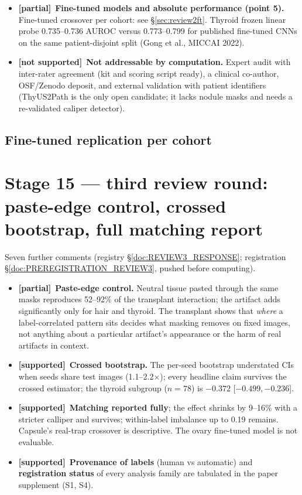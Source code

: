 \documentclass[10pt,a4paper]{article}
\newcommand{\ok}{\textcolor{green!50!black}{\textbf{[supported]}}}
\newcommand{\no}{\textcolor{red!70!black}{\textbf{[not supported]}}}
\newcommand{\mixed}{\textcolor{orange!80!black}{\textbf{[partial]}}}
\begin{document}
\begin{itemize}[leftmargin=*]
tool in the supplement and the remedies become a decision guide (author decision).
\item \mixed\ \textbf{Fine-tuned models and absolute performance (point 5).} Fine-tuned crossover per cohort: see
\S\ref{sec:review2ft}. Thyroid frozen linear probe 0.735--0.736 AUROC versus 0.773--0.799 for published fine-tuned CNNs
on the same patient-disjoint split (Gong et al., MICCAI 2022).
\item \no\ \textbf{Not addressable by computation.} Expert audit with inter-rater agreement (kit and scoring script
ready), a clinical co-author, OSF/Zenodo deposit, and external validation with patient identifiers (ThyUS2Path is the
only open candidate; it lacks nodule masks and needs a re-validated caliper detector).
\end{itemize}



\subsection*{Fine-tuned replication per cohort}\label{sec:review2ft}


\section{Stage 15 --- third review round: paste-edge control, crossed bootstrap, full matching report}\label{sec:review3}
Seven further comments (registry \S\ref{doc:REVIEW3_RESPONSE}; registration \S\ref{doc:PREREGISTRATION_REVIEW3}, pushed
before computing).
\begin{itemize}[leftmargin=*]\itemsep1pt
\item \mixed\ \textbf{Paste-edge control.} Neutral tissue pasted through the same masks reproduces 52--92\% of the
transplant interaction; the artifact adds significantly only for hair and thyroid. The transplant shows that \emph{where}
a label-correlated pattern sits decides what masking removes on fixed images, not anything about a particular artifact's
appearance or the harm of real artifacts in context.
\item \ok\ \textbf{Crossed bootstrap.} The per-seed bootstrap understated CIs when seeds share test images (1.1--2.2$\times$);
every headline claim survives the crossed estimator; the thyroid subgroup ($n=78$) is $-0.372$ [$-0.499,-0.236$].
\item \ok\ \textbf{Matching reported fully}; the effect shrinks by 9--16\% with a stricter calliper and survives; within-label
imbalance up to 0.19 remains. Capsule's real-trap crossover is descriptive. The ovary fine-tuned model is not evaluable.
\item \ok\ \textbf{Provenance of labels} (human vs automatic) and \textbf{registration status} of every analysis family are
tabulated in the paper supplement (S1, S4).
\end{itemize}

\end{document}
